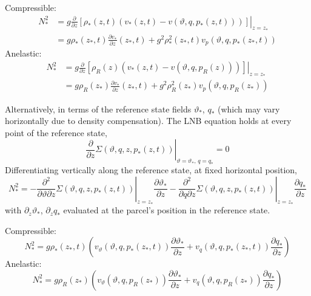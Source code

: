 \documentclass{article}
\begin{document}
Compressible:
\begin{align}
    N_*^2
    & =
    g
    \left.
    \frac{\partial}{\partial z}
    \left[
        \rho_*(z, t)
        \left(
            v_*(z, t)
            - v(\vartheta, q, p_*(z, t))
        \right)
    \right]
    \right|_{z = z_*}
    \\
    & =
    g \rho_*(z_*, t) \frac{\partial v_*}{\partial z}(z_*, t)
    + g^2 \rho_*^2(z_*, t) v_p(\vartheta, q, p_*(z_*, t))
\end{align}
Anelastic:
\begin{align}
    N_*^2
    & =
    g
    \left.
    \frac{\partial}{\partial z}
    \left[
        \rho_R(z)
        \left(
            v_*(z, t)
            - v(\vartheta, q, p_R(z))
        \right)
    \right]
    \right|_{z = z_*}
    \\
    & =
    g \rho_R(z_*) \frac{\partial v_*}{\partial z}(z_*, t)
    + g^2 \rho_R^2(z_*) v_p(\vartheta, q, p_R(z_*))
\end{align}

Alternatively, in terms of the reference state fields \(\vartheta_*\), \(q_*\) (which may vary horizontally due to density compensation).
The LNB equation holds at every point of the reference state,
\begin{equation}
    \left.
    \frac{\partial}{\partial z}
    \Sigma(\vartheta, q, z, p_*(z, t))
    \right|_{\vartheta = \vartheta_*, \, q = q_*}
    = 0
\end{equation}
Differentiating vertically along the reference state, at fixed horizontal position,
\begin{equation}
    N_*^2
    =
    - \left.
    \frac{\partial^2}{\partial \vartheta \partial z}
    \Sigma(\vartheta, q, z, p_*(z, t))
    \right|_{z = z_*}
    \frac{\partial \vartheta_*}{\partial z}
    - \left.
    \frac{\partial^2}{\partial q \partial z}
    \Sigma(\vartheta, q, z, p_*(z, t))
    \right|_{z = z_*}
    \frac{\partial q_*}{\partial z}
\end{equation}
with \(\partial_z \vartheta_*\), \(\partial_z q_*\) evaluated at the parcel's position in the reference state.

Compressible:
\begin{equation}
    N_*^2
    =
    g \rho_*(z_*, t)
    \left(
        v_\vartheta(\vartheta, q, p_*(z_*, t)) \frac{\partial \vartheta_*}{\partial z}
        + v_q(\vartheta, q, p_*(z_*, t)) \frac{\partial q_*}{\partial z}
    \right)
\end{equation}
Anelastic:
\begin{equation}
    N_*^2
    =
    g \rho_R(z_*)
    \left(
        v_\vartheta(\vartheta, q, p_R(z_*)) \frac{\partial \vartheta_*}{\partial z}
        + v_q(\vartheta, q, p_R(z_*)) \frac{\partial q_*}{\partial z}
    \right)
\end{equation}
\end{document}
